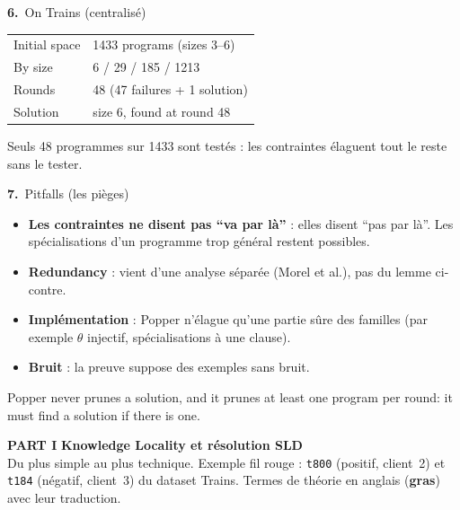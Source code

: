 \documentclass[10pt]{article}
\newcommand{\num}[1]{\textcolor{marine}{\textbf{#1.}}~}
\newcommand{\partie}[3]{\newpage
  \begin{tcolorbox}[colback=pastel, colframe=pastel, arc=0pt, boxrule=0pt,
    top=8pt, bottom=8pt, left=10pt]
  {\fontsize{26}{28}\selectfont\bfseries\textcolor{marine}{PART #1}}\quad
  {\Large\bfseries\textcolor{encre}{#2}}\\[2pt]{\small #3}
  \end{tcolorbox}\vspace{4pt}}
\begin{document}
\begin{minipage}[t]{0.52\textwidth}
\begin{bloc}{\num{6}On Trains (centralisé)}
{\scriptsize
\renewcommand{\arraystretch}{1.1}
\begin{tabular}{@{}l l@{}}
Initial space & 1433 programs (sizes 3--6)\\
By size & 6 / 29 / 185 / 1213\\
Rounds & 48 (47 failures + 1 solution)\\
Solution & size 6, found at round 48\\
\end{tabular}}\par\vspace{2pt}
\footnotesize Seuls 48 programmes sur 1433 sont testés : les contraintes élaguent tout le reste sans le tester.
\end{bloc}
\end{minipage}\hfill
\begin{minipage}[t]{0.46\textwidth}
\begin{bloc}{\num{7}Pitfalls (les pièges)}
\begin{itemize}
  \item \textbf{Les contraintes ne disent pas ``va par là''} : elles disent ``pas par là''. Les spécialisations d'un programme trop général restent possibles.
  \item \textbf{Redundancy} : vient d'une analyse séparée (Morel et al.), pas du lemme ci-contre.
  \item \textbf{Implémentation} : Popper n'élague qu'une partie sûre des familles (par exemple $\theta$ injectif, spécialisations à une clause).
  \item \textbf{Bruit} : la preuve suppose des exemples sans bruit.
\end{itemize}
\end{bloc}
\end{minipage}

\vspace{5pt}

\begin{tcolorbox}[colback=marine, colframe=marine, arc=0pt, boxrule=0pt,
  halign=center, top=3pt, bottom=3pt]
\color{white}\small Popper never prunes a solution, and it prunes at least one program per round: it must find a solution if there is one.
\end{tcolorbox}

\small
\partie{I}{Knowledge Locality et résolution SLD}{Du plus simple au plus technique. Exemple fil rouge : \texttt{t800} (positif, client~2) et \texttt{t184} (négatif, client~3) du dataset Trains. Termes de théorie en anglais (\textbf{gras}) avec leur traduction.}
\end{document}

